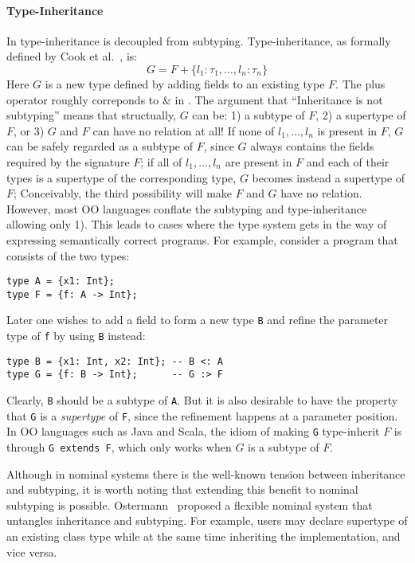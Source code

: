 \paragraph{Type-Inheritance} In \name type-inheritance is decoupled
from subtyping. Type-inheritance, as formally defined by Cook et
al.~\cite{cook1989inheritance}, is:
\[
G = F + \{ l_1:\tau_1, \ldots, l_n:\tau_n \}
\]
Here $G$ is a new type defined by adding fields to an existing type $F$.
The plus operator roughly correponds to $\&$ in \name. The
argument that ``Inheritance is not subtyping'' means that structually, $G$ can
be: 1) a subtype of $F$, 2) a supertype of $F$, or 3) $G$ and $F$ can have no
relation at all! If none of $l_1, \ldots, l_n$ is present in $F$, $G$ can be
safely regarded as a subtype of $F$, since $G$ always contains the fields
required by the signature $F$; if all of $l_1, \ldots, l_n$ are present in $F$
and each of their types is a supertype of the corresponding type, $G$ becomes
instead a supertype of $F$; Conceivably, the third possibility will make $F$ and
$G$ have no relation. However, most OO languages conflate the
subtyping and type-inheritance allowing only 1). This leads
to cases where the type system gets in the way of expressing semantically
correct programs. For example, consider a program that consists of the two
types:
\begin{lstlisting}
type A = {x1: Int};
type F = {f: A -> Int};
\end{lstlisting}
Later one wishes to add a field to form a new type \lstinline$B$ and refine the
parameter type of \lstinline$f$ by using \lstinline$B$ instead:
\begin{lstlisting}
type B = {x1: Int, x2: Int}; -- B <: A
type G = {f: B -> Int};      -- G :> F
\end{lstlisting}
Clearly, \lstinline$B$ should be a subtype of \lstinline$A$. But it is also
desirable to have the property that \lstinline$G$ is a \emph{supertype} of
\lstinline$F$, since the refinement happens at a parameter position. In OO
languages such as Java and Scala, the idiom of making \lstinline$G$ type-inherit
$F$ is through \lstinline$G extends F$, which only works when $G$ is a
subtype of $F$. 

Although in nominal systems there is the well-known tension between inheritance
and subtyping, it is worth noting that extending this benefit to nominal
subtyping is possible. Ostermann~\cite{ostermann2008nominal} proposed a flexible
nominal system that untangles inheritance and subtyping. For example, users may
declare supertype of an existing class type while at the same time inheriting
the implementation, and vice versa.

